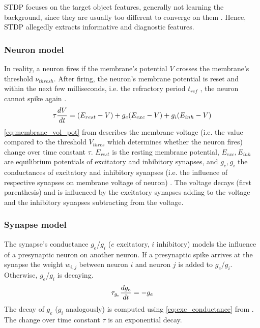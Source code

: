\ac{STDP} focuses on the target object features, generally not learning the background, since they are usually too different to converge on them \cite{multi_scale_STDP,STDP_vis_feat}.
Hence, \ac{STDP} allegedly extracts informative and diagnostic features.


\subsubsection{Neuron model}
\label{subsubsec:neuron_model}
In reality, a neuron fires if the membrane's potential $V$ crosses the membrane's threshold $\nu_{thresh}$.
After firing, the neuron's membrane potential is reset and within the next few milliseconds, i.e. the refractory period $t_{ref}$ \cite{RBM_SNN}, 
the neuron cannot spike again \cite{SNN}.
%
\begin{equation}
    \centering
    \label{eq:membrane_vol_pot}
    \tau \frac{dV}{dt} = (E_{rest} - V) + g_e(E_{exc} - V) + g_i(E_{inh} - V)
\end{equation}
%
\autoref{eq:membrane_vol_pot} from \cite{SNN} describes the membrane voltage 
(i.e. the value compared to the threshold $V_{thres}$ which determines whether the neuron fires) change over time constant $\tau$.
$E_{rest}$ is the resting membrane potential, $E_{exc}, E_{inh}$ are equilibrium potentials of excitatory and inhibitory synapses, 
and $g_e, g_i$ the conductances of excitatory and inhibitory synapses (i.e. the influence of respective synapses on membrane voltage of neuron) \cite{SNN}. 
The voltage decays (first parenthesis) and is influenced by the excitatory synapses 
adding to the voltage and the inhibitory synapses subtracting from the voltage.


\subsubsection{Synapse model}
\label{subsubsec:synapse_model}
The synapse's conductance $g_e$/$g_i$ ($e$ excitatory, $i$ inhibitory) models the influence of a presynaptic neuron on another neuron.
If a presynaptic spike arrives at the synapse the weight $w_{i,j}$ between neuron $i$ and neuron $j$ is added to $g_e$/$g_i$.
Otherwise, $g_e$/$g_i$ is decaying.
%
\begin{equation}
    \centering
    \label{eq:exc_conductance}
    \tau_{g_e} \frac{dg_e}{dt} = - g_e
\end{equation}
%
The decay of $g_e$ ($g_i$ analogously) is computed using \autoref{eq:exc_conductance} from \cite{SNN}.
The change over time constant $\tau$ is an exponential decay.



